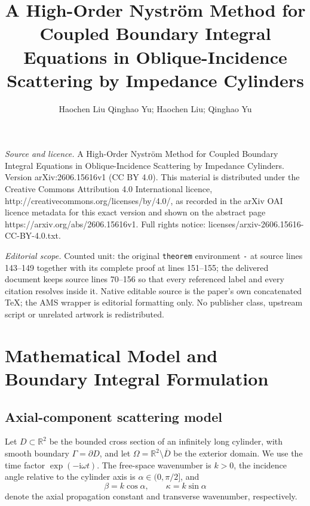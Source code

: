 \documentclass[10pt,a4paper]{amsart}
\numberwithin{equation}{section}
\newcommand{\ii}{\mathrm{i}}
\newcommand{\RR}{\mathbb{R}}
\begin{document}
\title[A High-Order Nystr"om Method for Coupled Boundary Integral E]{A High-Order Nystr\"om Method for Coupled Boundary Integral Equations in Oblique-Incidence Scattering by Impedance Cylinders}
\author{Haochen Liu Qinghao Yu; Haochen Liu; Qinghao Yu}
\date{}
\maketitle
\noindent\emph{Source and licence.} A High-Order Nystr\"om Method for Coupled Boundary Integral Equations in Oblique-Incidence Scattering by Impedance Cylinders. Version arXiv:2606.15616v1 (CC BY 4.0). This material is distributed under the Creative Commons Attribution 4.0 International licence, http://creativecommons.org/licenses/by/4.0/, as recorded in the arXiv OAI licence metadata for this exact version and shown on the abstract page https://arxiv.org/abs/2606.15616v1. Full rights notice: licenses/arxiv-2606.15616-CC-BY-4.0.txt.\par\smallskip
\noindent\textit{Editorial scope.} Counted unit: the original \texttt{theorem} environment \texttt{-} at source lines 143--149 together with its complete proof at lines 151--155; the delivered document keeps source lines 70--156 so that every referenced label and every citation resolves inside it. Native editable source is the paper's own concatenated TeX; the AMS wrapper is editorial formatting only. No publisher class, upstream script or unrelated artwork is redistributed.
\section{Mathematical Model and Boundary Integral Formulation}

\subsection{Axial-component scattering model}

Let $D\subset\RR^2$ be the bounded cross section of an infinitely long cylinder, with smooth boundary $\Gamma=\partial D$, and let $\Omega=\RR^2\setminus\overline D$ be the exterior domain. We use the time factor $\exp(-\ii\omega t)$. The free-space wavenumber is $k>0$, the incidence angle relative to the cylinder axis is $\alpha\in(0,\pi/2]$, and
\begin{equation}
\beta=k\cos\alpha,\qquad \kappa=k\sin\alpha
\end{equation}
denote the axial propagation constant and transverse wavenumber, respectively.
\end{document}
